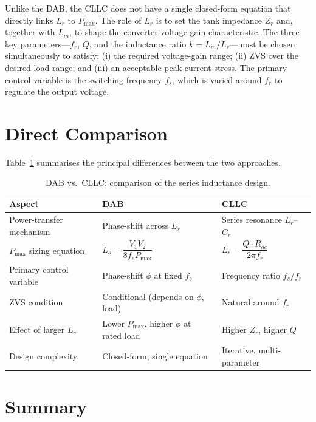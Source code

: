 \documentclass[a4paper, 11pt]{article}
\begin{document}
	Unlike the DAB, the CLLC does not have a single closed-form equation
	that directly links $L_r$ to $P_{\max}$.  The role of $L_r$ is to set
	the tank impedance $Z_r$ and, together with $L_m$, to shape the
	converter voltage gain characteristic.  The three key parameters—$f_r$,
	$Q$, and the inductance ratio $k = L_m / L_r$—must be chosen
	simultaneously to satisfy: (i) the required voltage-gain range;
	(ii) ZVS over the desired load range; and (iii) an acceptable
	peak-current stress.  The primary control variable is the switching
	frequency $f_s$, which is varied around $f_r$ to regulate the output
	voltage.
	
	\section{Direct Comparison}
	
	Table~\ref{tab:comparison} summarises the principal differences between
	the two approaches.
	
	\begin{table}[ht]
		\centering
		\caption{DAB vs.\ CLLC: comparison of the series inductance design.}
		\label{tab:comparison}
		\renewcommand{\arraystretch}{1.4}
		\begin{tabular}{lll}
			\toprule
			\textbf{Aspect} & \textbf{DAB} & \textbf{CLLC} \\
			\midrule
			Power-transfer mechanism
			& Phase-shift across $L_s$
			& Series resonance $L_r$–$C_r$ \\
			$P_{\max}$ sizing equation
			& $L_s = \dfrac{V_1 V_2}{8 f_s P_{\max}}$
			& $L_r = \dfrac{Q \cdot R_{ac}}{2\pi f_r}$ \\
			Primary control variable
			& Phase-shift $\phi$ at fixed $f_s$
			& Frequency ratio $f_s / f_r$ \\
			ZVS condition
			& Conditional (depends on $\phi$, load)
			& Natural around $f_r$ \\
			Effect of larger $L_s$
			& Lower $P_{\max}$, higher $\phi$ at rated load
			& Higher $Z_r$, higher $Q$ \\
			Design complexity
			& Closed-form, single equation
			& Iterative, multi-parameter \\
			\bottomrule
		\end{tabular}
	\end{table}
	
	\section{Summary}
	
\end{document}
